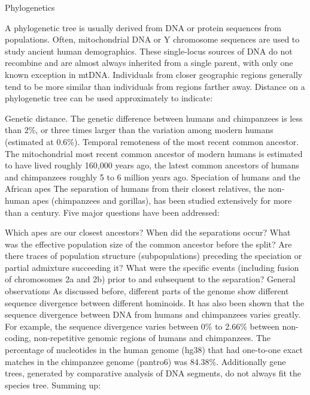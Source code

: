 Phylogenetics

A phylogenetic tree is usually derived from DNA or protein sequences from populations. Often, mitochondrial DNA or Y chromosome sequences are used to study ancient human demographics. These single-locus sources of DNA do not recombine and are almost always inherited from a single parent, with only one known exception in mtDNA. Individuals from closer geographic regions generally tend to be more similar than individuals from regions farther away. Distance on a phylogenetic tree can be used approximately to indicate:

Genetic distance. The genetic difference between humans and chimpanzees is less than 2\%, or three times larger than the variation among modern humans (estimated at 0.6\%).
Temporal remoteness of the most recent common ancestor. The mitochondrial most recent common ancestor of modern humans is estimated to have lived roughly 160,000 years ago, the latest common ancestors of humans and chimpanzees roughly 5 to 6 million years ago.
Speciation of humans and the African apes
The separation of humans from their closest relatives, the non-human apes (chimpanzees and gorillas), has been studied extensively for more than a century. Five major questions have been addressed:

Which apes are our closest ancestors?
When did the separations occur?
What was the effective population size of the common ancestor before the split?
Are there traces of population structure (subpopulations) preceding the speciation or partial admixture succeeding it?
What were the specific events (including fusion of chromosomes 2a and 2b) prior to and subsequent to the separation?
General observations
As discussed before, different parts of the genome show different sequence divergence between different hominoids. It has also been shown that the sequence divergence between DNA from humans and chimpanzees varies greatly. For example, the sequence divergence varies between 0\% to 2.66\% between non-coding, non-repetitive genomic regions of humans and chimpanzees. The percentage of nucleotides in the human genome (hg38) that had one-to-one exact matches in the chimpanzee genome (pantro6) was 84.38\%. Additionally gene trees, generated by comparative analysis of DNA segments, do not always fit the species tree. Summing up:

